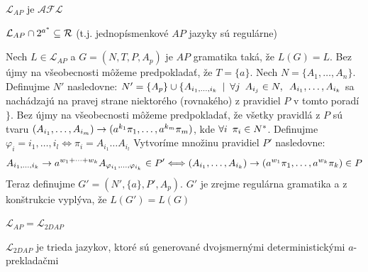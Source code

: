 \begin{veta}
  $\mathcal{L}_{AP}$ je $\mathcal{AFL}$
\end{veta}

\begin{veta}
  $\mathcal{L}_{AP}\cap 2^{a^{*}}\subseteq\mathcal{R}$ (t.j.
  jednopísmenkové $AP$ jazyky sú regulárne)
\end{veta}

\begin{dokaz}
  Nech $L\in\mathcal{L}_{AP}$ a $G=(N,T,P,A_p)$ je $AP$ gramatika
  taká, že $L(G)=L$. Bez újmy na všeobecnosti môžeme predpokladať,
  že $T=\{a\}$. Nech \mbox{$N=\{A_1,\dots,A_n\}$}. Definujme $N'$
  nasledovne: $N'=\{A_p\}\cup\{A_{i_1,\dots,i_k}\enspace |\enspace\forall j\enspace
  A_{i_j}\in N,\enspace A_{i_1},\dots,A_{i_k}$ sa nachádzajú na pravej
  strane niektorého (rovnakého) z pravidiel $P$ v tomto poradí$\}$.
  Bez újmy na všeobecnosti môžeme pred\-pokla\-dať, že všetky
  pravidlá z $P$ sú tvaru
  $(A_{i_1},\dots,A_{i_m})\rightarrow(a^{k_1}\pi_1,\dots,a^{k_m}\pi_m)$, kde
  $\forall i\enspace \pi_i\in N^*$. Definujme
  $\varphi_i=i_1,\dots,i_l\Longleftrightarrow\pi_i=A_{i_1}\dots
  A_{i_l}$ Vytvoríme množinu pravidiel $P'$ nasledovne:
  \[
  A_{i_1,\dots,i_k}\rightarrow
  a^{w_1+\cdots+w_k}A_{\varphi_{i_1},\dots,\varphi_{i_k}}\in
  P'\Longleftrightarrow
  (A_{i_1},\dots,A_{i_k})\rightarrow(a^{w_1}\pi_1,\dots,a^{w_k}\pi_k)\in P
  \]
  Teraz definujme $G'=(N',\{a\},P',A_p)$. $G'$ je zrejme regulárna
  gramatika a z konštrukcie vyplýva, že $L(G')=L(G)$
\end{dokaz}

\begin{veta}
  $\mathcal{L}_{AP}=\mathcal{L}_{2DAP}$
\end{veta}

\begin{poznamka}
  $\mathcal{L}_{2DAP}$ je trieda jazykov, ktoré sú generované
  dvojsmernými determi\-nis\-tic\-ký\-mi $a$-prek\-la\-dač\-mi
\end{poznamka}
